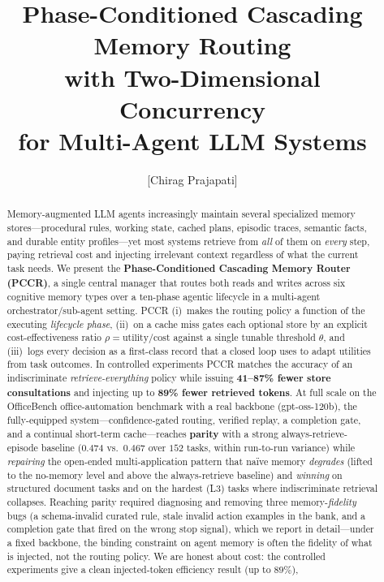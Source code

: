 \documentclass[10pt,twocolumn]{article}
\title{\textbf{Phase-Conditioned Cascading Memory Routing\\
with Two-Dimensional Concurrency\\
for Multi-Agent LLM Systems}}
\author[1]{[Chirag Prajapati]}
\date{}
\begin{document}
\maketitle

\begin{abstract}
\noindent
Memory-augmented LLM agents increasingly maintain several specialized memory
stores---procedural rules, working state, cached plans, episodic traces,
semantic facts, and durable entity profiles---yet most systems retrieve from
\emph{all} of them on \emph{every} step, paying retrieval cost and injecting
irrelevant context regardless of what the current task needs. We present the
\textbf{Phase-Conditioned Cascading Memory Router (PCCR)}, a single central
manager that routes both reads and writes across six cognitive memory types over
a ten-phase agentic lifecycle in a multi-agent orchestrator/sub-agent setting.
PCCR (i)~makes the routing policy a function of the executing \emph{lifecycle
phase}, (ii)~on a cache miss gates each optional store by an explicit
cost-effectiveness ratio $\rho=\text{utility}/\text{cost}$ against a single
tunable threshold $\theta$, and (iii)~logs every decision as a first-class record
that a closed loop uses to adapt utilities from task outcomes. In controlled experiments
PCCR matches the accuracy of an indiscriminate \emph{retrieve-everything} policy while
issuing \textbf{41--87\% fewer store consultations} and injecting up to
\textbf{89\% fewer retrieved tokens}. At full scale on the OfficeBench office-automation
benchmark with a real backbone (gpt-oss-120b), the fully-equipped system---confidence-gated
routing, verified replay, a completion gate, and a continual short-term cache---reaches
\textbf{parity} with a strong always-retrieve-episode baseline ($0.474$ vs.\ $0.467$ over
$152$ tasks, within run-to-run variance) while \emph{repairing} the open-ended
multi-application pattern that na\"ive memory \emph{degrades} (lifted to the no-memory level
and above the always-retrieve baseline) and \emph{winning} on structured document tasks and
on the hardest (L3) tasks where indiscriminate retrieval collapses. Reaching parity required
diagnosing and removing three memory-\emph{fidelity} bugs (a schema-invalid curated rule,
stale invalid action examples in the bank, and a completion gate that fired on the wrong stop
signal), which we report in detail---under a fixed backbone, the binding constraint on agent
memory is often the fidelity of what is injected, not the routing policy. We are honest
about cost: the controlled experiments give a clean injected-token efficiency result (up to $89\%$),

\end{abstract}
\end{document}
